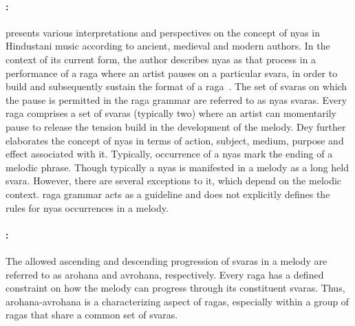\paragraph{:} \cite{Dey2008} presents various interpretations and perspectives on the concept of \gls{nyas} in Hindustani music according to ancient, medieval and modern authors. In the context of its current form, the author describes \gls{nyas} as that process in a performance of a \gls{raga} where an artist pauses on a particular \gls{svara}, in order to build and subsequently sustain the format of a \gls{raga}~\citep[p. 70]{Dey2008}. The set of \glspl{svara} on which the pause is permitted in the \gls{raga} grammar are referred to as \gls{nyas} \glspl{svara}. Every \gls{raga} comprises a set of \glspl{svara} (typically two)  where an artist can momentarily pause to release the tension build in the development of the melody. Dey further elaborates the concept of \gls{nyas} in terms of action, subject, medium, purpose and effect associated with it. Typically, occurrence of a \gls{nyas} mark the ending of a melodic phrase. Though typically a \gls{nyas} is manifested in a melody as a long held \gls{svara}. However, there are several exceptions to it, which depend on the melodic context. \Gls{raga} grammar acts as a guideline and does not explicitly defines the rules for \gls{nyas} occurrences in a melody. 

\paragraph{:}

The allowed ascending and descending progression of \glspl{svara} in a melody are referred to as \gls{arohana} and \gls{avrohana}, respectively. Every \gls{raga} has a defined constraint on how the melody can progress through its constituent \glspl{svara}. Thus, \gls{arohana}-\gls{avrohana} is a characterizing aspect of \glspl{raga}, especially within a group of \glspl{raga} that share a common set of \glspl{svara}. 

